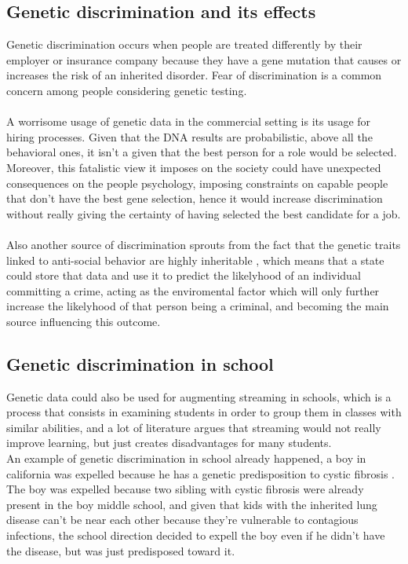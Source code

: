 \documentclass[12pt]{article}
\begin{document}
\subsection{Genetic discrimination and its effects}
Genetic discrimination occurs when people are treated differently by their employer or insurance company because they have a gene mutation that causes or increases the risk 
of an inherited disorder. Fear of discrimination is a common concern among people considering genetic testing. \cite{genetic_discrimination_GINA}\\
\\
A worrisome usage of genetic data in the commercial setting is its usage for hiring processes. Given that the DNA results are probabilistic, above all the behavioral ones, it isn't a given that the best person for a role would be selected. Moreover, this 
fatalistic view it imposes on the society could have unexpected consequences on the people psychology, imposing constraints on capable people that don't have the best gene selection,
 hence it would increase discrimination without really giving the certainty of having selected the best candidate for a job.\\
 \\
Also another source of discrimination sprouts from the fact that the genetic traits linked to anti-social behavior are highly inheritable \cite{genetic_data_misuse}, which means that a state could store that data and use it to predict the likelyhood of an individual committing a crime,
 acting as the enviromental factor which will only further increase the likelyhood of that person being a criminal, and becoming the main source influencing this outcome.\\

\subsection{Genetic discrimination in school}
Genetic data could also be used for augmenting streaming in schools, which is a process that consists in examining students in order to group them in classes with similar abilities, 
and a lot of literature argues that streaming would not really improve learning, but just creates disadvantages for many students. \cite{streaming_school}\\
An example of genetic discrimination in school already happened, a boy in california was expelled because he has a genetic predisposition to cystic fibrosis \cite{school_kicked_out}. The boy was expelled 
because two sibling with cystic fibrosis were already present in the boy middle school, and given that kids with the inherited lung disease can't be near each other because they're vulnerable to contagious infections, 
the school direction decided to expell the boy even if he didn't have the disease, but was just predisposed toward it.
\end{document}

